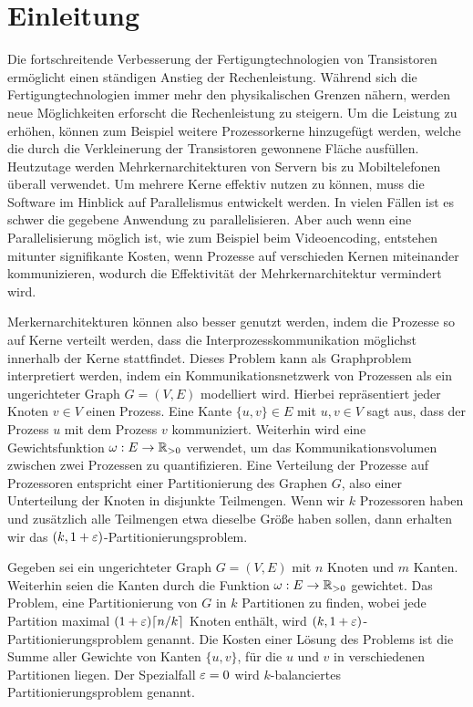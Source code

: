 
\chapter{Einleitung}\label{chapter:introduction}
Die fortschreitende Verbesserung der Fertigungtechnologien von Transistoren ermöglicht einen ständigen Anstieg der Rechenleistung.
Während sich die Fertigungtechnologien immer mehr den physikalischen Grenzen nähern, werden neue Möglichkeiten erforscht die Rechenleistung zu steigern.
Um die Leistung zu erhöhen, können zum Beispiel weitere Prozessorkerne hinzugefügt werden, welche die durch die Verkleinerung der Transistoren gewonnene Fläche ausfüllen.
Heutzutage werden Mehrkernarchitekturen von Servern bis zu Mobiltelefonen überall verwendet.
Um mehrere Kerne effektiv nutzen zu können, muss die Software im Hinblick auf Parallelismus entwickelt werden.
In vielen Fällen ist es schwer die gegebene Anwendung zu parallelisieren.
Aber auch wenn eine Parallelisierung möglich ist, wie zum Beispiel beim Videoencoding, entstehen mitunter signifikante Kosten, wenn Prozesse auf verschieden Kernen miteinander kommunizieren, wodurch die Effektivität der Mehrkernarchitektur vermindert wird.~\cite{LTS09}

Merkernarchitekturen können also besser genutzt werden, indem die Prozesse so auf Kerne verteilt werden, dass die Interprozesskommunikation möglichst innerhalb der Kerne stattfindet.
Dieses Problem kann als Graphproblem interpretiert werden, indem ein Kommunikationsnetzwerk von Prozessen als ein ungerichteter Graph $G = (V, E)$ modelliert wird.
Hierbei repräsentiert jeder Knoten $v \in V$ einen Prozess.
Eine Kante $\{u, v\} \in E$ mit $u, v \in V$ sagt aus, dass der Prozess $u$ mit dem Prozess $v$ kommuniziert.
Weiterhin wird eine Gewichtsfunktion $\omega : E \rightarrow \mathbb{R}_{>0}$ verwendet, um das Kommunikationsvolumen zwischen zwei Prozessen zu quantifizieren.
Eine Verteilung der Prozesse auf Prozessoren entspricht einer Partitionierung des Graphen $G$, also einer Unterteilung der Knoten in disjunkte Teilmengen.
Wenn wir $k$ Prozessoren haben und zusätzlich alle Teilmengen etwa dieselbe Größe haben sollen, dann erhalten wir das $(k, 1 + \varepsilon)$\hyp Partitionierungsproblem.

\begin{defn}
    Gegeben sei ein ungerichteter Graph $G = (V, E)$ mit $n$ Knoten und $m$ Kanten.
    Weiterhin seien die Kanten durch die Funktion $\omega : E \rightarrow \mathbb{R}_{> 0}$ gewichtet.
    Das Problem, eine Partitionierung von $G$ in $k$ Partitionen zu finden, wobei jede Partition maximal $(1 + \varepsilon) \lceil n/k\rceil$ Knoten enthält, wird $(k,1 + \varepsilon)$\hyp Partitionierungsproblem genannt.
    Die Kosten einer Lösung des Problems ist die Summe aller Gewichte von Kanten $\{u, v\}$, für die $u$ und $v$ in verschiedenen Partitionen liegen.
    Der Spezialfall $\varepsilon=0$ wird $k$\hyp balanciertes Partitionierungsproblem genannt.
\end{defn}

